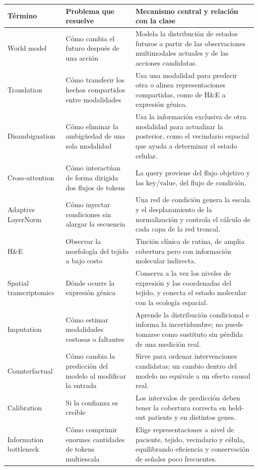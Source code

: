 \documentclass[a4paper]{article}
\begin{document}
\begin{center}
\small
\begin{tabularx}{\textwidth}{p{} X X}
\toprule
\textbf{Término} & \textbf{Problema que resuelve} & \textbf{Mecanismo central y relación con la clase} \\
\midrule
World model & Cómo cambia el futuro después de una acción & Modela la distribución de estados futuros a partir de las observaciones multimodales actuales y de las acciones candidatas. \\
Translation & Cómo transferir los hechos compartidos entre modalidades & Usa una modalidad para predecir otra o alinea representaciones compartidas, como de H\&E a expresión génica. \\
Disambiguation & Cómo eliminar la ambigüedad de una sola modalidad & Usa la información exclusiva de otra modalidad para actualizar la posterior, como el vecindario espacial que ayuda a determinar el estado celular. \\
Cross-attention & Cómo interactúan de forma dirigida dos flujos de tokens & La query proviene del flujo objetivo y las key/value, del flujo de condición. \\
Adaptive LayerNorm & Cómo inyectar condiciones sin alargar la secuencia & Una red de condición genera la escala y el desplazamiento de la normalización y controla el cálculo de cada capa de la red troncal. \\
H\&E & Observar la morfología del tejido a bajo costo & Tinción clínica de rutina, de amplia cobertura pero con información molecular indirecta. \\
Spatial transcriptomics & Dónde ocurre la expresión génica & Conserva a la vez los niveles de expresión y las coordenadas del tejido, y conecta el estado molecular con la ecología espacial. \\
Imputation & Cómo estimar modalidades costosas o faltantes & Aprende la distribución condicional e informa la incertidumbre; no puede tomarse como sustituto sin pérdida de una medición real. \\
Counterfactual & Cómo cambia la predicción del modelo al modificar la entrada & Sirve para ordenar intervenciones candidatas; un cambio dentro del modelo no equivale a un efecto causal real. \\
Calibration & Si la confianza es creíble & Los intervalos de predicción deben tener la cobertura correcta en held-out patients y en distintos genes. \\
Information bottleneck & Cómo comprimir enormes cantidades de tokens multiescala & Elige representaciones a nivel de paciente, tejido, vecindario y célula, equilibrando eficiencia y conservación de señales poco frecuentes. \\
\bottomrule
\end{tabularx}
\end{center}
\end{document}
